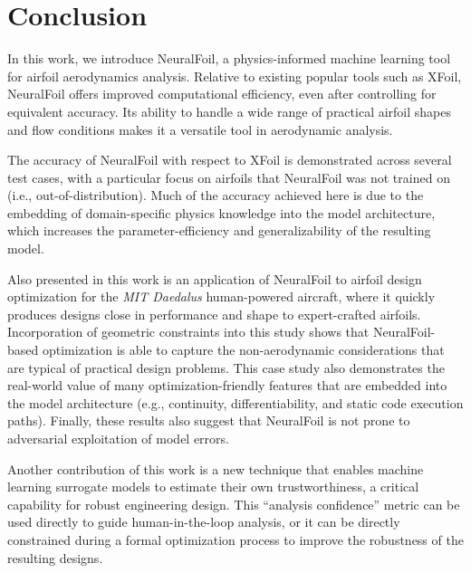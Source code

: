 \documentclass[journal]{new-aiaa}
\begin{document}
\section{Conclusion}
\label{sec:conclusion}

In this work, we introduce NeuralFoil, a physics-informed machine learning tool for airfoil aerodynamics analysis. Relative to existing popular tools such as XFoil, NeuralFoil offers improved computational efficiency, even after controlling for equivalent accuracy. Its ability to handle a wide range of practical airfoil shapes and flow conditions makes it a versatile tool in aerodynamic analysis.

The accuracy of NeuralFoil with respect to XFoil is demonstrated across several test cases, with a particular focus on airfoils that NeuralFoil was not trained on (i.e., out-of-distribution). Much of the accuracy achieved here is due to the embedding of domain-specific physics knowledge into the model architecture, which increases the parameter-efficiency and generalizability of the resulting model.

Also presented in this work is an application of NeuralFoil to airfoil design optimization for the \emph{MIT Daedalus} human-powered aircraft, where it quickly produces designs close in performance and shape to expert-crafted airfoils. Incorporation of geometric constraints into this study shows that NeuralFoil-based optimization is able to capture the non-aerodynamic considerations that are typical of practical design problems. This case study also demonstrates the real-world value of many optimization-friendly features that are embedded into the model architecture (e.g., continuity, differentiability, and static code execution paths). Finally, these results also suggest that NeuralFoil is not prone to adversarial exploitation of model errors.

Another contribution of this work is a new technique that enables machine learning surrogate models to estimate their own trustworthiness, a critical capability for robust engineering design. This ``analysis confidence'' metric can be used directly to guide human-in-the-loop analysis, or it can be directly constrained during a formal optimization process to improve the robustness of the resulting designs.
\end{document}
